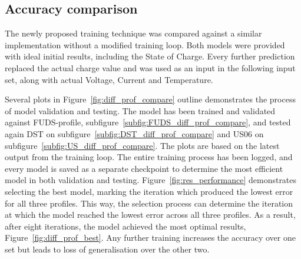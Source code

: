 \subsection{Accuracy comparison}
    The newly proposed training technique was compared against a similar implementation without a modified training loop.
    Both models were provided with ideal initial results, including the State of Charge.
    Every further prediction replaced the actual charge value and was used as an input in the following input set, along with actual Voltage, Current and Temperature.
    
    Several plots in Figure~\ref{fig:diff_prof_compare} outline demonstrates the process of model validation and testing.
    The model has been trained and validated against FUDS-profile, subfigure~\ref{subfig:FUDS_diff_prof_compare}, and tested again DST on subfigure~\ref{subfig:DST_diff_prof_compare} and US06 on subfigure~\ref{subfig:US_diff_prof_compare}.
    The plots are based on the latest output from the training loop.
    The entire training process has been logged, and every model is saved as a separate checkpoint to determine the most efficient model in both validation and testing.
    Figure~\ref{fig:res_performance} demonstrates selecting the best model, marking the iteration which produced the lowest error for all three profiles.
    This way, the selection process can determine the iteration at which the model reached the lowest error across all three profiles. 
    As a result, after eight iterations, the model achieved the most optimal results, Figure~\ref{fig:diff_prof_best}.
    Any further training increases the accuracy over one set but leads to loss of generalisation over the other two.

